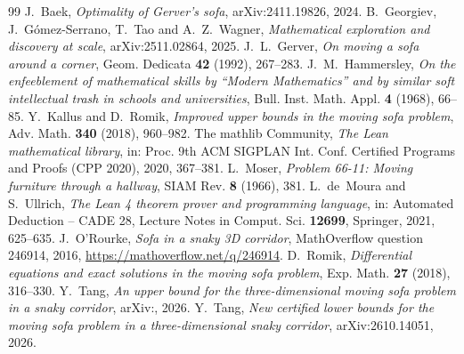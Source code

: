 \documentclass[11pt]{amsart}
\theoremstyle{definition}
\theoremstyle{remark}
\numberwithin{equation}{section}
\begin{document}
\begin{thebibliography}{99}
 J.~Baek, \emph{Optimality of Gerver's sofa}, arXiv:2411.19826, 2024.
 B.~Georgiev, J.~G\'omez-Serrano, T.~Tao and A.~Z.~Wagner, \emph{Mathematical exploration and discovery at scale}, arXiv:2511.02864, 2025.
 J.~L.~Gerver, \emph{On moving a sofa around a corner}, Geom. Dedicata \textbf{42} (1992), 267--283.
 J.~M.~Hammersley, \emph{On the enfeeblement of mathematical skills by ``Modern Mathematics'' and by similar soft intellectual trash in schools and universities}, Bull. Inst. Math. Appl. \textbf{4} (1968), 66--85.
 Y.~Kallus and D.~Romik, \emph{Improved upper bounds in the moving sofa problem}, Adv. Math. \textbf{340} (2018), 960--982.
 The mathlib Community, \emph{The Lean mathematical library}, in: Proc. 9th ACM SIGPLAN Int. Conf. Certified Programs and Proofs (CPP 2020), 2020, 367--381.
 L.~Moser, \emph{Problem 66-11: Moving furniture through a hallway}, SIAM Rev. \textbf{8} (1966), 381.
 L.~de~Moura and S.~Ullrich, \emph{The Lean 4 theorem prover and programming language}, in: Automated Deduction -- CADE 28, Lecture Notes in Comput. Sci. \textbf{12699}, Springer, 2021, 625--635.
 J.~O'Rourke, \emph{Sofa in a snaky 3D corridor}, MathOverflow question 246914, 2016, \url{https://mathoverflow.net/q/246914}.
 D.~Romik, \emph{Differential equations and exact solutions in the moving sofa problem}, Exp. Math. \textbf{27} (2018), 316--330.
 Y.~Tang, \emph{An upper bound for the three-dimensional moving sofa problem in a snaky corridor}, arXiv:, 2026.
 Y.~Tang, \emph{New certified lower bounds for the moving sofa problem in a three-dimensional snaky corridor}, arXiv:2610.14051, 2026.
\end{thebibliography}
\end{document}
